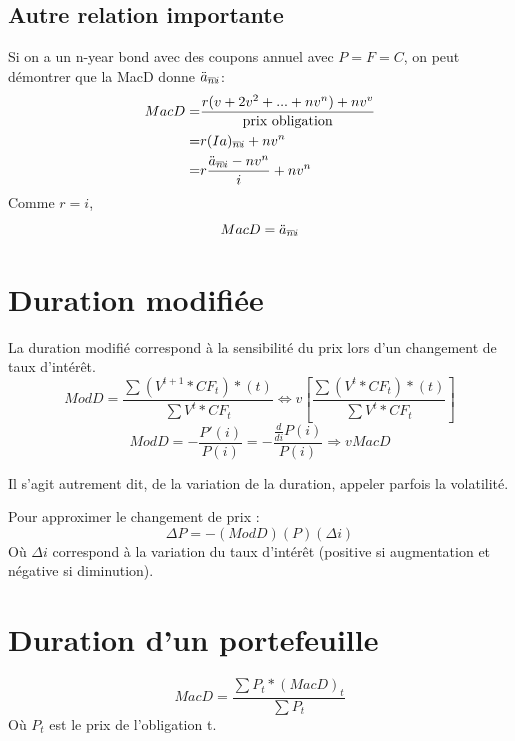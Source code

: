 \documentclass[11pt,french]{report}
\makeatletter
\DeclareRobustCommand{\annuity}[1]{%
\def\arraystretch{0}%
\setlength\arraycolsep{.7pt}%
\setlength\arrayrulewidth{.3pt}%
\begin{array}[b]{@{}c|}\hline
\\[\arraycolsep]%
\scriptstyle #1%
\end{array}%
}
\makeatother
\begin{document}
\subsection{Autre relation importante}

Si on a un n-year bond avec des coupons annuel avec $P = F = C$, on peut démontrer que la MacD donne $\ddot{a}_{\annuity{n}i}$:
\begin{align*}
MacD = & \frac{r(v+2v^2+...+nv^n) + nv^v}{\text{prix obligation}} \\
= & r(Ia)_{\annuity{n}i} + nv^n \\
= & r \frac{\ddot{a}_{\annuity{n}i} - nv^n}{i} + nv^n
\end{align*}
Comme $r=i$,
\begin{equation}
MacD = \ddot{a}_{\annuity{n}i}
\end{equation}

\section{Duration modifiée}
\label{sec:modified duration}

La duration modifié correspond à la sensibilité du prix lors d'un changement de taux d'intérêt.
\begin{equation}
ModD = \frac{\sum (V^{t+1}*CF_{t})*(t)}{\sum V^{t}*CF_{t}} \Leftrightarrow v [\frac{\sum (V^{t}*CF_{t})*(t)}{\sum V^{t}*CF_{t}}]
\end{equation}
\begin{equation}
ModD = -\frac{P'(i)}{P(i)} = -\frac{\frac{d}{di}P(i)}{P(i)} \Rightarrow v MacD 
\end{equation}

Il s'agit autrement dit, de la variation de la duration, appeler parfois la volatilité.

Pour approximer le changement de prix :
\begin{equation}
\Delta P = - (ModD)(P)(\Delta i)
\end{equation}
Où $\Delta i$ correspond à la variation du taux d'intérêt (positive si augmentation et négative si diminution).

\section{Duration d'un portefeuille}
\label{sec:duration portefeuille}

\begin{equation}
MacD = \frac{\sum P_t*(MacD)_t}{\sum P_t}
\end{equation}
Où $P_t$ est le prix de l'obligation t.
\end{document}
